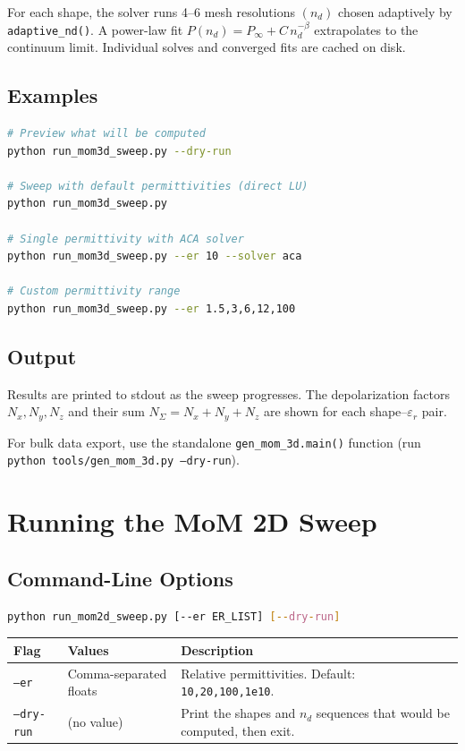 \documentclass[a4paper,11pt]{article}
\begin{document}
For each shape, the solver runs 4--6 mesh resolutions $(n_d)$ chosen
adaptively by \texttt{adaptive\_nd()}.  A power-law fit
$P(n_d) = P_\infty + C\, n_d^{-\beta}$ extrapolates to the continuum
limit.  Individual solves and converged fits are cached on disk.

\subsection{Examples}

\begin{lstlisting}[language=bash]
# Preview what will be computed
python run_mom3d_sweep.py --dry-run

# Sweep with default permittivities (direct LU)
python run_mom3d_sweep.py

# Single permittivity with ACA solver
python run_mom3d_sweep.py --er 10 --solver aca

# Custom permittivity range
python run_mom3d_sweep.py --er 1.5,3,6,12,100
\end{lstlisting}

\subsection{Output}

Results are printed to stdout as the sweep progresses.  The depolarization
factors $N_x, N_y, N_z$ and their sum $N_{\Sigma} = N_x + N_y + N_z$ are
shown for each shape--$\varepsilon_r$ pair.

For bulk data export, use the standalone \texttt{gen\_mom\_3d.main()}
function (run \texttt{python tools/gen\_mom\_3d.py --dry-run}).

\section{Running the MoM 2D Sweep}

\subsection{Command-Line Options}

\begin{lstlisting}[language=bash]
python run_mom2d_sweep.py [--er ER_LIST] [--dry-run]
\end{lstlisting}

\begin{center}
\begin{tabular}{@{}llp{6cm}@{}}
\toprule
Flag & Values & Description \\
\midrule
\texttt{--er} & Comma-separated floats
    & Relative permittivities.  Default: \texttt{10,20,100,1e10}. \\
\texttt{--dry-run} & (no value)
    & Print the shapes and $n_d$ sequences that would be computed, then exit. \\
\bottomrule
\end{tabular}
\end{center}
\end{document}
